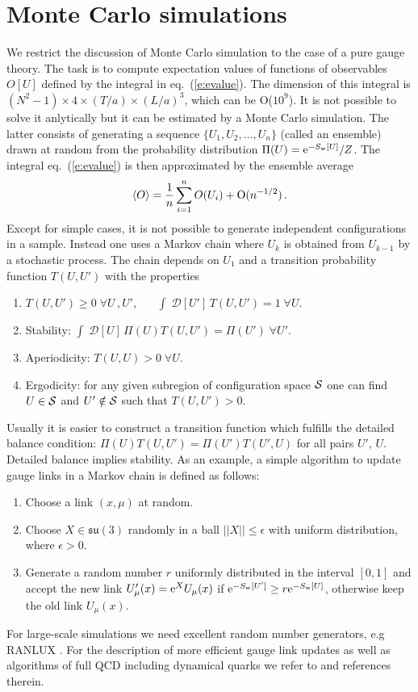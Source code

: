 \documentclass{PoS}
\newcommand{\eq}[1]{eq.~(\ref{#1})}
\newcommand{\ev}[1]{\left\langle #1 \right\rangle}
\newcommand{\su}[1]{\mathfrak{su}(#1)}
\newcommand{\gauge} [3][U]{\ensuremath{#1_{#2}(#3)}}
\newcommand{\Sw}{S_{\rm w}}
\newcommand{\rD}[1]{{\mathcal D}[#1]}
\begin{document}
\section{Monte Carlo simulations}

We restrict the discussion of Monte Carlo simulation to the
case of a pure gauge theory. The task is to compute expectation values of
functions of observables $O[U]$ defined by the integral in \eq{e:evalue}.
The dimension of this integral is
$(N^2-1)\times 4\times (T/a)\times (L/a)^3$, which can be O($10^9$).
It is not possible to solve it anlytically but it can be estimated by
a Monte Carlo simulation. The latter consists of generating a sequence
$\{U_1,U_2,\ldots, U_n \}$ (called an ensemble) drawn at random from the 
probability distribution $\Pi(U)={\rm e}^{-\Sw[U]}/Z$. 
The integral \eq{e:evalue} is then approximated by the ensemble average 
\begin{equation}\label{e:evalueestimate}
\ev{O} = \frac{1}{n}\sum_{i=1}^{n} O(U_i) + {\rm O}(n^{-1/2}) \,.
\end{equation}
Except for simple cases, it is not possible to generate independent
configurations in a sample. Instead one uses a Markov chain where $U_k$ is 
obtained from $U_{k-1}$ by a stochastic process. The chain depends on
$U_1$ and a transition probability function $T(U,U')$ with the
properties \cite{Luscher:2010ae}
\begin{enumerate}
\item $T(U,U')\ge0\;\forall U\,,U'$,~~~ $\int\; \rD{U'}\, T(U,U')=1\;\forall U$.
\item Stability: $\int\; \rD{U}\, \Pi(U)T(U,U') = \Pi(U')\;\forall U'$.
\item Aperiodicity: $T(U,U)>0\;\forall U$.
\item Ergodicity: for any given subregion of configuration space ${\cal S}$ 
one can find $U\in{\cal S}$ and $U'\notin{\cal S}$ such that $T(U,U')>0$.
\end{enumerate}
Usually it is easier to construct a transition function which fulfills the
detailed balance condition: $\Pi(U)T(U,U') = \Pi(U')T(U',U)$ for all pairs
$U'$, $U$. Detailed balance implies stability.
As an example, a simple algorithm to update gauge links in a Markov chain
is defined as follows:
\begin{enumerate}
\item Choose a link $(x,\mu)$ at random.
\item Choose $X\in\su{3}$ randomly in a ball $||X||\le\epsilon$ with 
uniform distribution, where $\epsilon>0$.
\item Generate a random number $r$ uniformly distributed in the interval 
$[0,1]$ and accept the new link $\gauge[U']{\mu}{x}={\rm e}^{X}\gauge{\mu}{x}$
if ${\rm e}^{-\Sw[U']}\ge r{\rm e}^{-\Sw[U]}$, 
otherwise keep the old link $\gauge{\mu}{x}$.
\end{enumerate}
For large-scale simulations we need excellent random number
generators, e.g RANLUX \cite{Luscher:1993dy}.
For the description of more efficient gauge link updates as well as
algorithms of full QCD including dynamical quarks we refer to
\cite{Knechtli:2017sna} and references therein.
\end{document}
